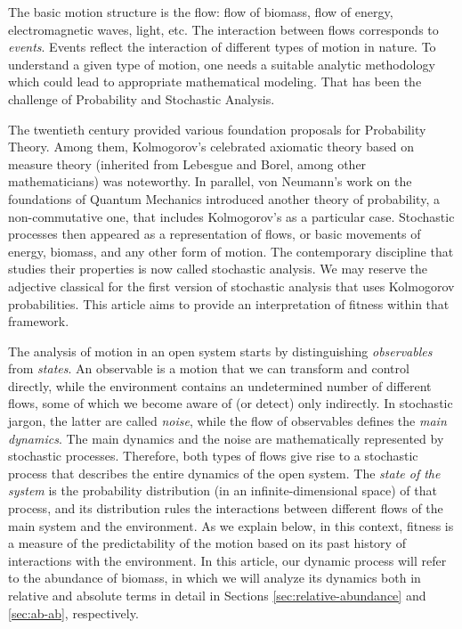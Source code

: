 \documentclass[12pt]{article}
\begin{document}
The basic motion structure is the flow: flow of biomass, flow of energy, electromagnetic waves, light, etc. The  interaction between flows corresponds to \textit{ events}. Events reflect the interaction of different types of motion in nature. To understand a given type of motion, one needs a suitable analytic methodology which could lead to appropriate mathematical modeling. That has been the challenge of Probability and Stochastic Analysis. 

The twentieth century provided various foundation proposals for Probability Theory. Among them, Kolmogorov's celebrated axiomatic theory based on measure theory (inherited from Lebesgue and Borel, among other mathematicians) was noteworthy. In parallel, von Neumann's work on the foundations of Quantum Mechanics introduced another theory of probability, a non-commutative one, that includes Kolmogorov's as a particular case. Stochastic processes then appeared as a representation of flows, or basic movements of energy, biomass, and any other form of motion. The contemporary discipline that studies their properties is now called stochastic analysis. We may reserve the adjective classical for the first version of stochastic analysis that uses Kolmogorov probabilities. This article aims to provide an interpretation of fitness within that framework.

The analysis of motion in an open system starts by distinguishing \textit{observables} from \textit{states}. An observable is a motion that we can transform and control directly, while the environment contains an undetermined number of different flows, some of which we become aware of (or detect) only indirectly. In stochastic jargon, the latter are called \textit{noise}, while the flow of observables defines the \textit{main dynamics}. The main dynamics and the noise are mathematically represented by stochastic processes. Therefore, both types of flows give rise to a stochastic process that describes the entire dynamics of the open system. The \textit{state of the system} is the probability distribution (in an infinite-dimensional space) of that process, and its distribution rules the interactions between different flows of the main system and the environment. As we explain below, in this context, fitness is a measure of the predictability of the motion based on its past history of interactions with the environment. In this article, our dynamic process will refer to the abundance of biomass, in which we will analyze its dynamics both in relative  and absolute  terms in detail in Sections \ref{sec:relative-abundance} and \ref{sec:ab-ab}, respectively.
\end{document}

